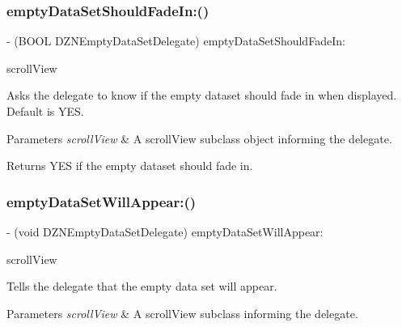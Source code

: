\subsubsection{\texorpdfstring{empty\+Data\+Set\+Should\+Fade\+In\+:()}{emptyDataSetShouldFadeIn:()}}
{\footnotesize\ttfamily -\/ (B\+O\+OL D\+Z\+N\+Empty\+Data\+Set\+Delegate) empty\+Data\+Set\+Should\+Fade\+In\+: \begin{DoxyParamCaption}\item[{(U\+I\+Scroll\+View $\ast$)}]{scroll\+View }\end{DoxyParamCaption}\hspace{0.3cm}{\ttfamily [optional]}}

Asks the delegate to know if the empty dataset should fade in when displayed. Default is Y\+ES.


\begin{DoxyParams}{Parameters}
{\em scroll\+View} & A scroll\+View subclass object informing the delegate. \\
\hline
\end{DoxyParams}
\begin{DoxyReturn}{Returns}
Y\+ES if the empty dataset should fade in. 
\end{DoxyReturn}
\mbox{\label{protocol_d_z_n_empty_data_set_delegate_01-p_af626f41aaead4d169befc534eccf2a00}} 
\subsubsection{\texorpdfstring{empty\+Data\+Set\+Will\+Appear\+:()}{emptyDataSetWillAppear:()}}
{\footnotesize\ttfamily -\/ (void D\+Z\+N\+Empty\+Data\+Set\+Delegate) empty\+Data\+Set\+Will\+Appear\+: \begin{DoxyParamCaption}\item[{(U\+I\+Scroll\+View $\ast$)}]{scroll\+View }\end{DoxyParamCaption}\hspace{0.3cm}{\ttfamily [optional]}}

Tells the delegate that the empty data set will appear.


\begin{DoxyParams}{Parameters}
{\em scroll\+View} & A scroll\+View subclass informing the delegate. \\
\hline
\end{DoxyParams}
\mbox{\label{protocol_d_z_n_empty_data_set_delegate_01-p_ace940190eff5c572b4ed54407eba0f61}} 
